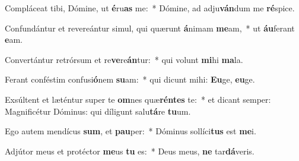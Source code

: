\item Compláceat tibi, Dómine, ut \textbf{é}ru\textbf{as} me:~* Dómine, ad adju\textbf{ván}dum me \textbf{ré}spice.
\item Confundántur et revereántur simul, qui quærunt \textbf{á}nimam \textbf{me}am,~* ut \textbf{áu}ferant \textbf{e}am.
\item Convertántur retrórsum et re\textbf{ve}re\textbf{án}tur:~* qui volunt \textbf{mi}hi \textbf{ma}la.
\item Ferant conféstim confusi\textbf{ó}nem \textbf{su}am:~* qui dicunt mihi: \textbf{Eu}ge, \textbf{eu}ge.
\item Exsúltent et læténtur super te \textbf{om}nes quæ\textbf{rén}\textbf{tes} te:~* et dicant semper: Magnificétur Dóminus: qui díligunt salu\textbf{tá}re \textbf{tu}um.
\item Ego autem mendícus \textbf{sum}, et \textbf{pau}per:~* Dóminus sollíci\textbf{tus} est \textbf{me}i.
\item Adjútor meus et protéctor \textbf{me}us \textbf{tu} es:~* Deus meus, \textbf{ne} tar\textbf{dá}veris.
